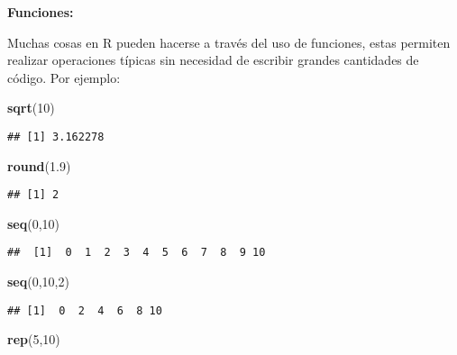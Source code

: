 \documentclass[
]{book}
\newenvironment{Shaded}{\begin{snugshade}}{\end{snugshade}}
\newcommand{\DecValTok}[1]{\textcolor[rgb]{0.00,0.00,0.81}{#1}}
\newcommand{\FloatTok}[1]{\textcolor[rgb]{0.00,0.00,0.81}{#1}}
\newcommand{\FunctionTok}[1]{\textcolor[rgb]{0.13,0.29,0.53}{\textbf{#1}}}
\newcommand{\NormalTok}[1]{#1}
\begin{document}
\textbf{Funciones:}

Muchas cosas en R pueden hacerse a través del uso de funciones, estas
permiten realizar operaciones típicas sin necesidad de escribir grandes
cantidades de código. Por ejemplo:

\begin{Shaded}
\begin{Highlighting}[]
\FunctionTok{sqrt}\NormalTok{(}\DecValTok{10}\NormalTok{)}
\end{Highlighting}
\end{Shaded}

\begin{verbatim}
## [1] 3.162278
\end{verbatim}

\begin{Shaded}
\begin{Highlighting}[]
\FunctionTok{round}\NormalTok{(}\FloatTok{1.9}\NormalTok{)}
\end{Highlighting}
\end{Shaded}

\begin{verbatim}
## [1] 2
\end{verbatim}

\begin{Shaded}
\begin{Highlighting}[]
\FunctionTok{seq}\NormalTok{(}\DecValTok{0}\NormalTok{,}\DecValTok{10}\NormalTok{)}
\end{Highlighting}
\end{Shaded}

\begin{verbatim}
##  [1]  0  1  2  3  4  5  6  7  8  9 10
\end{verbatim}

\begin{Shaded}
\begin{Highlighting}[]
\FunctionTok{seq}\NormalTok{(}\DecValTok{0}\NormalTok{,}\DecValTok{10}\NormalTok{,}\DecValTok{2}\NormalTok{)}
\end{Highlighting}
\end{Shaded}

\begin{verbatim}
## [1]  0  2  4  6  8 10
\end{verbatim}

\begin{Shaded}
\begin{Highlighting}[]
\FunctionTok{rep}\NormalTok{(}\DecValTok{5}\NormalTok{,}\DecValTok{10}\NormalTok{)}
\end{Highlighting}
\end{Shaded}
\end{document}
